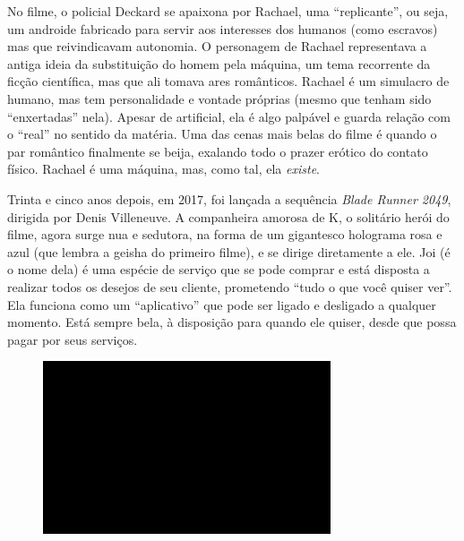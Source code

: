 No filme, o policial Deckard se apaixona por Rachael, uma
``replicante'', ou seja, um androide fabricado para servir aos
interesses dos humanos (como escravos) mas que reivindicavam autonomia.
O personagem de Rachael representava a antiga ideia da substituição do
homem pela máquina, um tema recorrente da ficção científica, mas que ali
tomava ares românticos. Rachael é um simulacro de humano, mas tem
personalidade e vontade próprias (mesmo que tenham sido ``enxertadas''
nela). Apesar de artificial, ela é algo palpável e guarda relação com o
``real'' no sentido da matéria. Uma das cenas mais belas do filme é
quando o par romântico finalmente se beija, exalando todo o prazer
erótico do contato físico. Rachael é uma máquina, mas, como tal, ela
\emph{existe}.

Trinta e cinco anos depois, em 2017, foi lançada a sequência \emph{Blade
Runner 2049}, dirigida por Denis Villeneuve. A companheira amorosa de K,
o solitário herói do filme, agora surge nua e sedutora, na forma de um
gigantesco holograma rosa e azul (que lembra a geisha do primeiro
filme), e se dirige diretamente a ele. Joi (é o nome dela) é uma espécie
de serviço que se pode comprar e está disposta a realizar todos os
desejos de seu cliente, prometendo ``tudo o que você quiser ver''. Ela
funciona como um ``aplicativo'' que pode ser ligado e desligado a
qualquer momento. Está sempre bela, à disposição para quando ele quiser,
desde que possa pagar por seus serviços.

\begin{figure}[!ht]

\centering
 \includegraphics[width=85mm]{./imgs/im1.jpg}
\caption{\tiny{}}

\end{figure}

